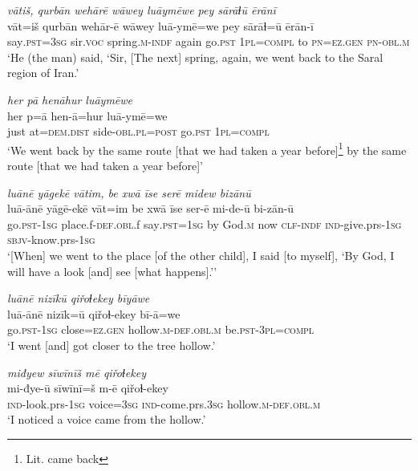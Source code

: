 \ea \label{ZQ.33}
\textit{vātiš, qurbān wehārē wāwey luāymēwe pey sārāɫū ērānī} \\ 
\gll vāt=iš qurbān wehār-ē wāwey luā-ymē=we pey sārāɫ=ū ērān-ī \\ 
 say\textsc{.pst}\textsc{=3sg} sir.\textsc{voc} spring\textsc{.m}\textsc{-indf} again go\textsc{.pst} \textsc{1pl}\textsc{=compl} to \textsc{pn}\textsc{=ez.gen} \textsc{pn}\textsc{-obl}\textsc{.m} \\ 
\glt `He (the man) said, ‘Sir, [The next] spring, again, we went back to the Saral region of Iran.'
\z 
 
\ea \label{ZQ.34}
\textit{her pā henāhur luāymēwe} \\ 
\gll her p=ā hen-ā=hur luā-ymē=we \\ 
 just at=\textsc{dem.dist} side\textsc{-obl}\textsc{.pl}\textsc{=\textsc{post}} go\textsc{.pst} \textsc{1pl}\textsc{=compl} \\ 
\glt `We went back by the same route [that we had taken a year before]\footnote{Lit. came back} by the same route [that we had taken a year before]'
\z 
 
\ea \label{ZQ.35}
\textit{luānē yāgekē vātim, be xwā īse serē midew bizānū} \\ 
\gll luā-ānē yāgē-ekē vāt=im be xwā īse ser-ē mi-de-ū bi-zān-ū \\ 
 go\textsc{.pst}\textsc{-\textsc{1sg}} place.f\textsc{-def}\textsc{.obl}.f say\textsc{.pst}\textsc{=\textsc{1sg}} by God\textsc{.m} now \textsc{clf}\textsc{-indf} \textsc{ind-}give.prs\textsc{-\textsc{1sg}} \textsc{sbjv-}know.prs\textsc{-\textsc{1sg}} \\ 
\glt `[When] we went to the place [of the other child], I said [to myself], ‘By God, I will have a look [and] see [what happens].’'
\z 
 
\ea \label{ZQ.36}
\textit{luānē nizīkū qiřoɫekey bīyāwe} \\ 
\gll luā-ānē nizīk=ū qiřoɫ-ekey bī-ā=we \\ 
 go\textsc{.pst}\textsc{-\textsc{1sg}} close=\textsc{ez.gen} hollow\textsc{.m}\textsc{-def}\textsc{.obl}\textsc{.m} be\textsc{.pst}\textsc{-3pl}\textsc{=compl} \\ 
\glt `I went [and] got closer to the tree hollow.'
\z 
 
\ea \label{ZQ.37}
\textit{miđyew sīwīnīš mē qiřoɫekey} \\ 
\gll mi-đye-ū sīwīnī=š m-ē qiřoɫ-ekey \\ 
 \textsc{ind-}look.prs\textsc{-\textsc{1sg}} voice\textsc{=3sg} \textsc{ind-}come.prs\textsc{.3sg} hollow\textsc{.m}\textsc{-def}\textsc{.obl}\textsc{.m} \\ 
\glt `I noticed a voice came from the hollow.'
\z 
 
